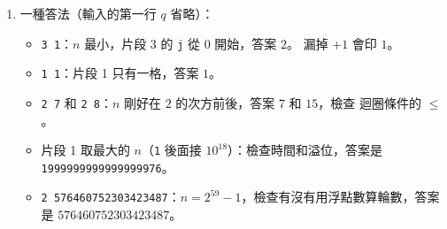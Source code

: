 \begin{enumerate}
\item 一種答法（輸入的第一行 $q$ 省略）：
\begin{itemize}
\item \texttt{3 1}：$n$ 最小，片段 3 的 \texttt{j} 從 $0$ 開始，答案 $2$。 漏掉
$+1$ 會印 $1$。
\item \texttt{1 1}：片段 1 只有一格，答案 $1$。
\item \texttt{2 7} 和 \texttt{2 8}：$n$ 剛好在 $2$ 的次方前後，答案 $7$ 和 $15$，檢查
迴圈條件的 $\le$。
\item 片段 1 取最大的 $n$（\texttt{1} 後面接 $10^{18}$）：檢查時間和溢位，答案是
\texttt{1999999999999999976}。
\item \texttt{2 576460752303423487}：$n = 2^{59} - 1$，檢查有沒有用浮點數算輪數，答案
是 $576460752303423487$。
\end{itemize}
\end{enumerate}
